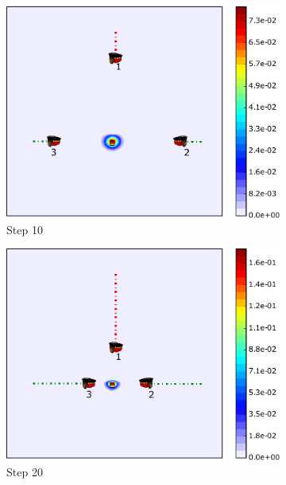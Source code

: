 \documentclass[journal]{IEEEtranTIE}
\theoremstyle{remark}
\begin{document}
\begin{figure}
\begin{subfigure}[b]{0.21\textwidth}
			\includegraphics[width=\textwidth]{sonar_mov_sen_sta_tar_rbt1_step10_16-TIE-3798}
			\caption{Step 10}\label{fig:sonar_mov_sen_sta_tar_rbt1_step10}
		\end{subfigure}	
		\begin{subfigure}[b]{0.21\textwidth}
			\includegraphics[width=\textwidth]{sonar_mov_sen_sta_tar_rbt1_step20_16-TIE-3798}
			\caption{Step 20}\label{fig:sonar_mov_sen_sta_tar_rbt1_step20}
		\end{subfigure}	
		\begin{subfigure}[b]{0.21\textwidth}

\end{subfigure}
\end{figure}
\end{document}
